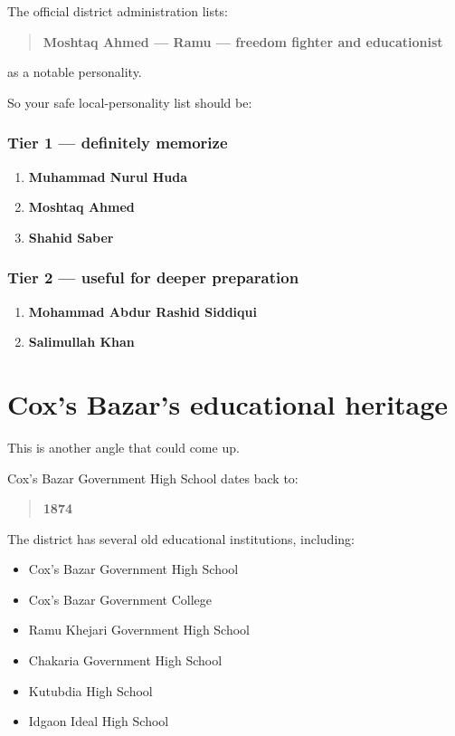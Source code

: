 The official district administration lists:

\begin{quote}
\textbf{Moshtaq Ahmed --- Ramu --- freedom fighter and educationist}\\
\end{quote}

as a notable personality.

So your safe local-personality list should be:

\subsubsection{Tier 1 --- definitely memorize}

\begin{enumerate}
  \item \textbf{Muhammad Nurul Huda}
  \item \textbf{Moshtaq Ahmed}
  \item \textbf{Shahid Saber}
\end{enumerate}

\subsubsection{Tier 2 --- useful for deeper preparation}

\begin{enumerate}
  \item \textbf{Mohammad Abdur Rashid Siddiqui}
  \item \textbf{Salimullah Khan}
\end{enumerate}

\medskip

\section{Cox's Bazar's educational heritage}

This is another angle that could come up.

Cox's Bazar Government High School dates back to:

\begin{quote}
\textbf{1874}\\
\end{quote}

The district has several old educational institutions, including:

\begin{itemize}
  \item Cox's Bazar Government High School
  \item Cox's Bazar Government College
  \item Ramu Khejari Government High School
  \item Chakaria Government High School
  \item Kutubdia High School
  \item Idgaon Ideal High School
\end{itemize}

